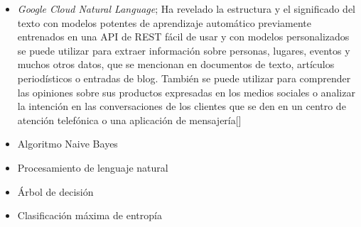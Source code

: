 	\begin{itemize}
		\item \textit{Google Cloud Natural Language}; Ha revelado la estructura y el significado del texto con modelos potentes de aprendizaje automático previamente entrenados en una API de REST fácil de usar y con modelos personalizados se puede utilizar para extraer información sobre personas, lugares, eventos y muchos otros datos, que se mencionan en documentos de texto, artículos periodísticos o entradas de blog. También se puede utilizar para comprender las opiniones sobre sus productos expresadas en los medios sociales o analizar la intención en las conversaciones de los clientes que se den en un centro de atención telefónica o una aplicación de mensajería[]
		\item Algoritmo Naive Bayes
		\item Procesamiento de lenguaje natural
		\item Árbol de decisión
		\item Clasificación máxima de entropía
	\end{itemize}
